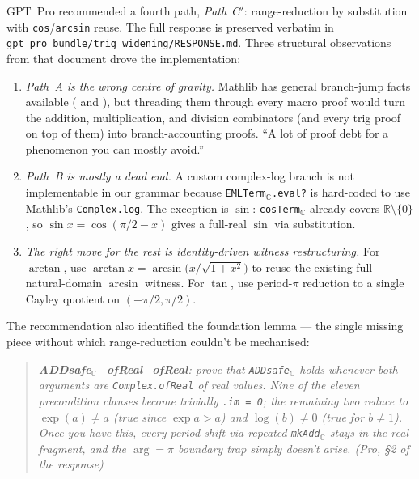 \documentclass[11pt,a4paper]{article}
\theoremstyle{plain}
\theoremstyle{definition}
\begin{document}
GPT~Pro recommended a fourth path, \emph{Path~$C'$}: range-reduction
by substitution with \texttt{cos}/\texttt{arcsin} reuse. The full
response is preserved verbatim in
\texttt{gpt\_pro\_bundle/trig\_widening/RESPONSE.md}. Three structural
observations from that document drove the implementation:

\begin{enumerate}[topsep=2pt, itemsep=4pt]
\item \emph{Path~A is the wrong centre of gravity.} Mathlib has
  general branch-jump facts available (
  and ), but threading them through every
  macro proof would turn the addition, multiplication, and division
  combinators (and every trig proof on top of them) into
  branch-accounting proofs. ``A lot of proof debt for a phenomenon
  you can mostly avoid.''

\item \emph{Path~B is mostly a dead end.} A custom complex-log
  branch is not implementable in our grammar because
  \texttt{EMLTerm}$_{\mathbb{C}}$\texttt{.eval?} is hard-coded to use
  Mathlib's \texttt{Complex.log}. The exception is $\sin$:
  \texttt{cosTerm}$_{\mathbb{C}}$ already covers
  $\mathbb{R} \setminus \{0\}$, so $\sin x = \cos(\pi/2 - x)$ gives
  a full-real $\sin$ via substitution.

\item \emph{The right move for the rest is identity-driven witness
  restructuring.} For $\arctan$, use $\arctan x =
  \arcsin\bigl(x / \sqrt{1 + x^2}\bigr)$ to reuse the existing
  full-natural-domain $\arcsin$ witness. For $\tan$, use period-$\pi$
  reduction to a single Cayley quotient on $(-\pi/2, \pi/2)$.
\end{enumerate}

The recommendation also identified the foundation lemma --- the
single missing piece without which range-reduction couldn't be
mechanised:

\begin{quote}\itshape\small
\textbf{ADDsafe}$_{\mathbb{C}}$\textbf{\_ofReal\_ofReal}: prove that
\texttt{ADDsafe}$_{\mathbb{C}}$ holds whenever both arguments are
\texttt{Complex.ofReal} of real values. Nine of the eleven precondition
clauses become trivially \texttt{.im = 0}; the remaining two reduce
to $\exp(a) \neq a$ (true since $\exp a > a$) and $\log(b) \neq 0$
(true for $b \neq 1$). Once you have this, every period shift via
repeated \texttt{mkAdd}$_{\mathbb{C}}$ stays in the real fragment, and
the $\arg = \pi$ boundary trap simply doesn't arise.
\hfill (Pro, \S2 of the response)
\end{quote}
\end{document}
